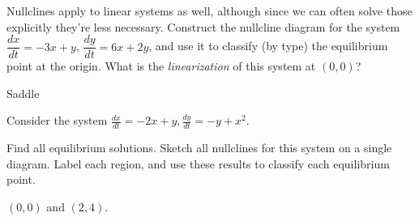 \begin{exercise}
Nullclines apply to linear systems as well, although since we can often solve those explicitly they're less necessary. Construct the nullcline diagram for the system $\dfrac{dx}{dt}=-3x+y$, $\dfrac{dy}{dt}=6x+2y$, and use it to classify (by type) the equilibrium point at the origin. What is the {\it linearization} of this system at $(0,0)$?
\end{exercise}
\comboSol{%
}
{%
Saddle \hfill{}\hfill\hfill
}

\begin{exercise}
Consider the system $\displaystyle \frac{dx}{dt}= -2x+y, \frac{dy}{dt}=-y+x^2$.
\begin{tasks}
\task Find all equilibrium solutions.
\task Sketch all nullclines for this system on a single diagram. Label each region, and use these results to classify each equilibrium point.
\end{tasks}
\end{exercise}
\comboSol{%
}
{%
$(0,0)$ and $(2, 4)$. \hfill{}\hfill\hfill
}

